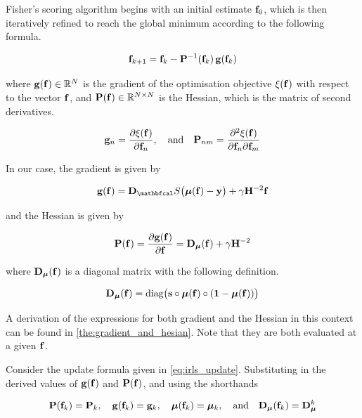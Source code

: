 Fisher's scoring algorithm begins with an initial estimate $\mathbf{f}_0$, which is then iteratively refined to reach the global minimum according to the following formula. 

\begin{equation}
    \label{eq:irls_update}
    \mathbf{f}_{k+1} = \mathbf{f}_{k} - \mathbf{P}^{-1}(\mathbf{f}_k) \, \mathbf{g}(\mathbf{f}_k)
\end{equation}

where $ \mathbf{g}(\mathbf{f}) \in \mathbb{R}^N$ is the gradient of the optimisation objective $\xi(\mathbf{f})$ with respect to the vector $\mathbf{f}$, and $\mathbf{P}(\mathbf{f}) \in \mathbb{R}^{N \times N}$ is the Hessian, which is the matrix of second derivatives. 

\begin{equation*}
    \mathbf{g}_n = \frac{\partial \xi(\mathbf{f})}{\partial \mathbf{f}_n}, \quad \text{and} \quad \mathbf{P}_{nm} = \frac{\partial^2 \xi(\mathbf{f})}{\partial \mathbf{f}_n \partial \mathbf{f}_m}
\end{equation*}

In our case, the gradient is given by 

\begin{equation}
    \g(\f) = \D_\St \big(\muu(\f) - \y\big) + \gamma \HH^{-2} \f
\end{equation}

and the Hessian is given by 

\begin{equation}
    \label{eq:logistic_gsr_P}
    \mathbf{P}(\mathbf{f}) = \frac{\partial \mathbf{g}(\mathbf{f})}{\partial \mathbf{f}} =  \mathbf{D}_{\boldsymbol{\mu}}(\mathbf{f}) + \gamma \mathbf{H}^{-2}
\end{equation}

where $\mathbf{D}_{\boldsymbol{\mu}}(\mathbf{f})$ is a diagonal matrix with the following definition. 

\begin{equation}
    \mathbf{D}_{\boldsymbol{\mu}}(\mathbf{f}) = \text{diag}\big(\mathbf{s} \circ \boldsymbol{\mu}(\mathbf{f}) \circ (\mathbf{1} - \boldsymbol{\mu}(\mathbf{f}))\big)
\end{equation}

A derivation of the expressions for both gradient and the Hessian in this context can be found in \cref{the:gradient_and_hesian}. Note that they are both evaluated at a given $\mathbf{f}$. 

Consider the update formula given in \cref{eq:irls_update}. Substituting in the derived values of $\mathbf{g}(\mathbf{f})$ and $\mathbf{P}(\mathbf{f})$, and using the shorthands

\begin{equation*}
    \mathbf{P}(\mathbf{f}_k) = \mathbf{P}_k, \quad \mathbf{g}(\mathbf{f}_k) = \mathbf{g}_k, \quad \boldsymbol{\mu}(\mathbf{f}_k) = \boldsymbol{\mu}_k, \quad \text{and} \quad \mathbf{D}_{\boldsymbol{\mu}}(\mathbf{f}_k) = \mathbf{D}_{\boldsymbol{\mu}}^k
\end{equation*}

